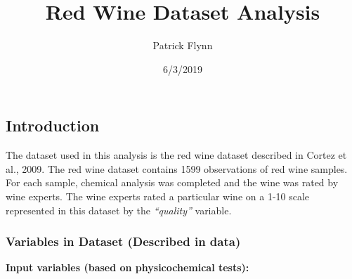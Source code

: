 \documentclass[]{article}
\title{Red Wine Dataset Analysis}
\author{Patrick Flynn}
\date{6/3/2019}
\begin{document}
\maketitle

\hypertarget{introduction}{%
\subsection{Introduction}\label{introduction}}

The dataset used in this analysis is the red wine dataset described in
Cortez et al., 2009. The red wine dataset contains 1599 observations of
red wine samples. For each sample, chemical analysis was completed and
the wine was rated by wine experts. The wine experts rated a particular
wine on a 1-10 scale represented in this dataset by the
\emph{``quality''} variable.

\hypertarget{variables-in-dataset-described-in-data}{%
\subsubsection{Variables in Dataset (Described in
data)}\label{variables-in-dataset-described-in-data}}

\textbf{Input variables (based on physicochemical tests):}
\end{document}
